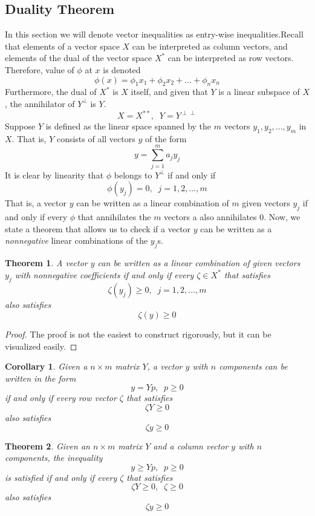 \documentclass{article}
\newtheorem{theorem}{Theorem}[section]
\newtheorem{corollary}{Corollary}[theorem]
\theoremstyle{remark}
\theoremstyle{definition}
\begin{document}
\subsection{Duality Theorem}
In this section we will denote vector inequalities as entry-wise inequalities.Recall that elements of a vector space $X$ can be interpreted as column vectors, and elements of the dual of the vector space $X^*$ can be interpreted as row vectors. Therefore, value of $\phi$ at $x$ is denoted
\[\phi (x) = \phi_1 x_1 + \phi_2 x_2 + ... + \phi_n x_n\]
Furthermore, the dual of $X^*$ is $X$ itself, and given that $Y$ is a linear subspace of $X$, the annihilator of $Y^\perp$ is $Y$. 
\[X = X^{**}, \;\; Y = Y^{\perp\perp}\]
Suppose $Y$ is defined as the linear space spanned by the $m$ vectors $y_1, y_2, ..., y_m$ in $X$. That is, $Y$ consists of all vectors $y$ of the form
\[y = \sum_{j=1}^m a_j y_j\]
It is clear by linearity that $\phi$ belongs to $Y^\perp$ if and only if
\[\phi (y_j) = 0, \;\; j = 1, 2, ..., m\]
That is, a vector $y$ can be written as a linear combination of $m$ given vectors $y_j$ if and only if every $\phi$ that annihilates the $m$ vectors a also annihilates $0$. Now, we state a theorem that allows us to check if a vector $y$ can be written as a \textit{nonnegative} linear combinations of the $y_j$s. 

\begin{theorem}
A vector $y$ can be written as a linear combination of given vectors $y_j$ with nonnegative coefficients if and only if every $\zeta \in X^*$ that satisfies 
\[ \zeta (y_j) \geq 0, \;\; j = 1, 2, ..., m\]
also satisfies 
\[\zeta (y) \geq 0\]
\end{theorem}
\begin{proof}
The proof is not the easiest to construct rigorously, but it can be visualized easily. 
\end{proof}

\begin{corollary}
Given a $n \times m$ matrix $Y$, a vector $y$ with $n$ components can be written in the form 
\[y = Y p, \;\; p \geq 0\]
if and only if every row vector $\zeta$ that satisfies 
\[\zeta Y \geq 0\]
also satisfies 
\[\zeta y \geq 0\]
\end{corollary}

\begin{theorem}
Given an $n \times m$ matrix $Y$ and a column vector $y$ with $n$ components, the inequality 
\[y \geq Y p, \;\; p \geq 0\]
is satisfied if and only if every $\zeta$ that satisfies
\[\zeta Y \geq 0, \;\; \zeta \geq 0\]
also satisfies 
\[\zeta y \geq 0\]
\end{theorem}
\end{document}
